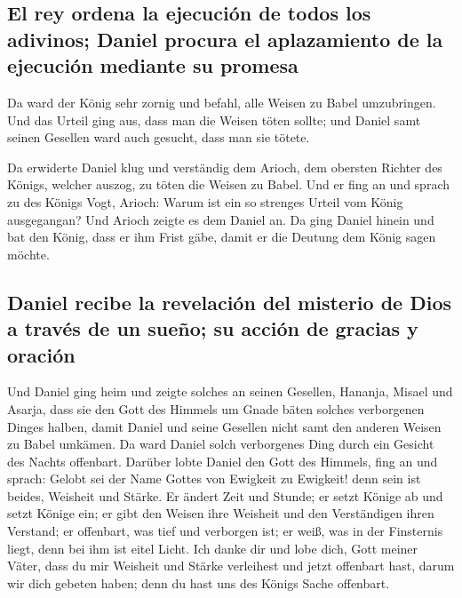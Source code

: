 \hypertarget{el-rey-ordena-la-ejecuciuxf3n-de-todos-los-adivinos-daniel-procura-el-aplazamiento-de-la-ejecuciuxf3n-mediante-su-promesa}{%
\subsection{El rey ordena la ejecución de todos los adivinos; Daniel
procura el aplazamiento de la ejecución mediante su
promesa}\label{el-rey-ordena-la-ejecuciuxf3n-de-todos-los-adivinos-daniel-procura-el-aplazamiento-de-la-ejecuciuxf3n-mediante-su-promesa}}

 Da ward der König sehr zornig und befahl, alle Weisen zu
Babel umzubringen.  Und das Urteil ging aus, dass man die
Weisen töten sollte; und Daniel samt seinen Gesellen ward auch gesucht,
dass man sie tötete.

 Da erwiderte Daniel klug und verständig dem Arioch, dem
obersten Richter des Königs, welcher auszog, zu töten die Weisen zu
Babel.  Und er fing an und sprach zu des Königs Vogt,
Arioch: Warum ist ein so strenges Urteil vom König ausgegangan? Und
Arioch zeigte es dem Daniel an.  Da ging Daniel hinein
und bat den König, dass er ihm Frist gäbe, damit er die Deutung dem
König sagen möchte.

\hypertarget{daniel-recibe-la-revelaciuxf3n-del-misterio-de-dios-a-travuxe9s-de-un-sueuxf1o-su-acciuxf3n-de-gracias-y-oraciuxf3n}{%
\subsection{Daniel recibe la revelación del misterio de Dios a través de
un sueño; su acción de gracias y
oración}\label{daniel-recibe-la-revelaciuxf3n-del-misterio-de-dios-a-travuxe9s-de-un-sueuxf1o-su-acciuxf3n-de-gracias-y-oraciuxf3n}}

 Und Daniel ging heim und zeigte solches an seinen
Gesellen, Hananja, Misael und Asarja,  dass sie den Gott
des Himmels um Gnade bäten solches verborgenen Dinges halben, damit
Daniel und seine Gesellen nicht samt den anderen Weisen zu Babel
umkämen.  Da ward Daniel solch verborgenes Ding durch ein
Gesicht des Nachts offenbart.  Darüber lobte Daniel den
Gott des Himmels, fing an und sprach: Gelobt sei der Name Gottes von
Ewigkeit zu Ewigkeit! denn sein ist beides, Weisheit und Stärke.
 Er ändert Zeit und Stunde; er setzt Könige ab und setzt
Könige ein; er gibt den Weisen ihre Weisheit und den Verständigen ihren
Verstand;  er offenbart, was tief und verborgen ist; er
weiß, was in der Finsternis liegt, denn bei ihm ist eitel Licht.
 Ich danke dir und lobe dich, Gott meiner Väter, dass du
mir Weisheit und Stärke verleihest und jetzt offenbart hast, darum wir
dich gebeten haben; denn du hast uns des Königs Sache offenbart.


